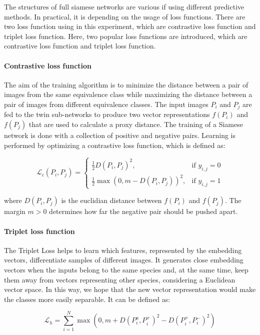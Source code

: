 \documentclass{article}
\begin{document}
The structures of full siamese networks are various if using different predictive methods. In practical, it is depending on the usage of loss functions. There are two loss function using in this experiment, which are contrastive loss function and triplet loss function. Here, two popular loss functions are introduced, which are contrastive loss function and triplet loss function.


\paragraph{Contrastive loss function}The aim of the training algorithm is to minimize the distance between a pair of images from the same equivalence class while maximizing the distance between a pair of images from different equivalence classes. The input images $P_i$ and $P_j$ are fed to the twin sub-networks to produce two vector representations $f(P_i)$ and $f(P_j)$ that are used to calculate a proxy distance. The training of a Siamese network is done
with a collection of positive and negative pairs. Learning is performed by optimizing a contrastive
loss function, which is defined as:

\begin{equation}
  \mathcal{L}_c (P_i,P_j)=
  \begin{cases}
  \frac{1}{2} D(P_i,P_j)^2, & \text{if } y_{i,j}=0 \\
  \frac{1}{2} \max(0,m-D(P_i,P_j))^2, & \text{if } y_{i,j}=1
  \end{cases}
\end{equation}

where $D(P_i, P_j)$ is the euclidian distance between $f(P_i)$ and $f(P_j)$. The margin $m > 0$ determines
how far the negative pair should be pushed apart.


\paragraph{Triplet loss function} The Triplet Loss helps to learn which features, represented by the embedding
vectors, differentiate samples of different images. It generates close embedding vectors when the inputs belong to the same species and, at the same time, keep them away from vectors representing other species, considering a Euclidean vector space. In this way, we hope that the new vector representation would make the classes more easily separable. It can be defined as:
 

\begin{equation}
  \mathcal{L}_h= \sum_{i=1}^N \max(0, m+D(P_i^a,P_i^+)^2-D(P_i^+,P_i^-)^2)
\end{equation}
\end{document}
